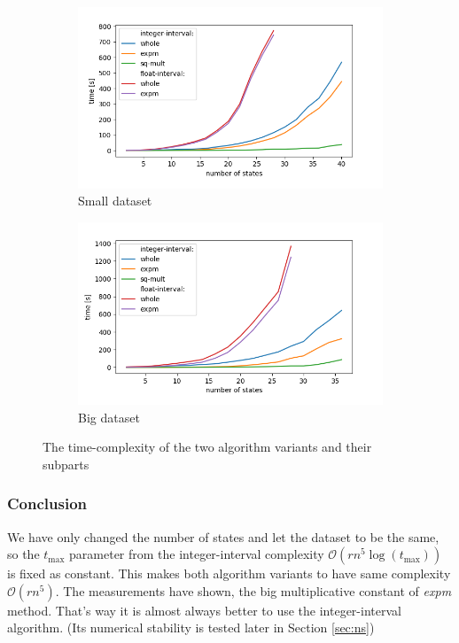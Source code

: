 \documentclass[thesis=M,english]{FITthesis}[2012/10/20]
\begin{document}
\begin{figure}
\centering
\begin{subfigure}{.8\textwidth}
  \centering
  \includegraphics[width=1\linewidth]{img/ex2/small.png}
  \caption{Small dataset}
  \label{fig:e2small}
\end{subfigure}
\begin{subfigure}{.8\textwidth}
  \centering
  \includegraphics[width=\linewidth]{img/ex2/big.png}
  \caption{Big dataset}
  \label{fig:e2big}
\end{subfigure}
\caption{ The time-complexity of the two algorithm variants and their subparts }
\label{fig:e2n}
\end{figure}

\subsubsection*{ Conclusion }

We have only changed the number of states and let the dataset to be the same, so the $t_{\max}$ parameter from the integer-interval complexity $\mathcal{O}(r n^5 \log(t_{\max}))$ is fixed as constant. This makes both algorithm variants to have same complexity $\mathcal{O}(r n^5)$. The measurements have shown, the big multiplicative constant of \textit{expm} method. That's way it is almost always better to use the integer-interval algorithm. (Its numerical stability is tested later in Section \ref{sec:ns}) 
\end{document}
